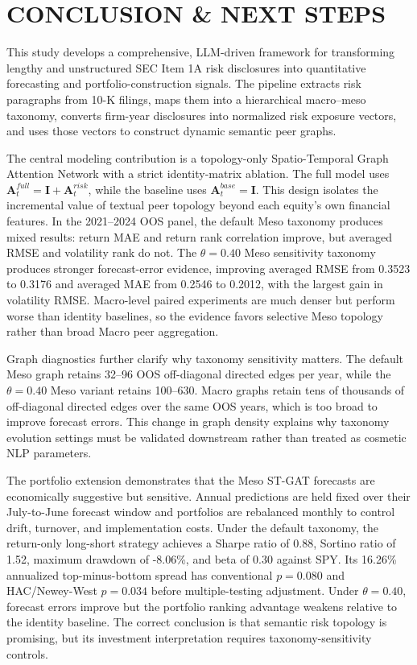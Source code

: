 \documentclass[11pt, a4paper]{article}
\begin{document}
\section{CONCLUSION \& NEXT STEPS}

This study develops a comprehensive, LLM-driven framework for transforming lengthy and unstructured SEC Item 1A risk disclosures into quantitative forecasting and portfolio-construction signals. The pipeline extracts risk paragraphs from 10-K filings, maps them into a hierarchical macro--meso taxonomy, converts firm-year disclosures into normalized risk exposure vectors, and uses those vectors to construct dynamic semantic peer graphs.

The central modeling contribution is a topology-only Spatio-Temporal Graph Attention Network with a strict identity-matrix ablation. The full model uses $\mathbf{A}^{full}_{t}=\mathbf{I}+\mathbf{A}^{risk}_{t}$, while the baseline uses $\mathbf{A}^{base}_{t}=\mathbf{I}$. This design isolates the incremental value of textual peer topology beyond each equity's own financial features. In the 2021--2024 OOS panel, the default Meso taxonomy produces mixed results: return MAE and return rank correlation improve, but averaged RMSE and volatility rank do not. The $\theta=0.40$ Meso sensitivity taxonomy produces stronger forecast-error evidence, improving averaged RMSE from 0.3523 to 0.3176 and averaged MAE from 0.2546 to 0.2012, with the largest gain in volatility RMSE. Macro-level paired experiments are much denser but perform worse than identity baselines, so the evidence favors selective Meso topology rather than broad Macro peer aggregation.

Graph diagnostics further clarify why taxonomy sensitivity matters. The default Meso graph retains 32--96 OOS off-diagonal directed edges per year, while the $\theta=0.40$ Meso variant retains 100--630. Macro graphs retain tens of thousands of off-diagonal directed edges over the same OOS years, which is too broad to improve forecast errors. This change in graph density explains why taxonomy evolution settings must be validated downstream rather than treated as cosmetic NLP parameters.

The portfolio extension demonstrates that the Meso ST-GAT forecasts are economically suggestive but sensitive. Annual predictions are held fixed over their July-to-June forecast window and portfolios are rebalanced monthly to control drift, turnover, and implementation costs. Under the default taxonomy, the return-only long-short strategy achieves a Sharpe ratio of 0.88, Sortino ratio of 1.52, maximum drawdown of -8.06\%, and beta of 0.30 against SPY. Its 16.26\% annualized top-minus-bottom spread has conventional $p=0.080$ and HAC/Newey-West $p=0.034$ before multiple-testing adjustment. Under $\theta=0.40$, forecast errors improve but the portfolio ranking advantage weakens relative to the identity baseline. The correct conclusion is that semantic risk topology is promising, but its investment interpretation requires taxonomy-sensitivity controls.
\end{document}
